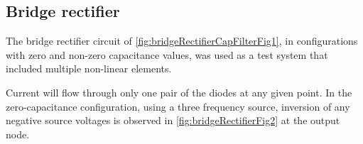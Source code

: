 


\subsection{Bridge rectifier}

The bridge rectifier circuit of
\cref{fig:bridgeRectifierCapFilterFig1}, in configurations with zero and non-zero capacitance values, 
was used as a test system that included multiple non-linear elements.


Current will flow through only one pair of the diodes at any given point.
In the zero-capacitance configuration, using a three frequency source, inversion of any negative source voltages is observed in \cref{fig:bridgeRectifierFig2} at the output node.



